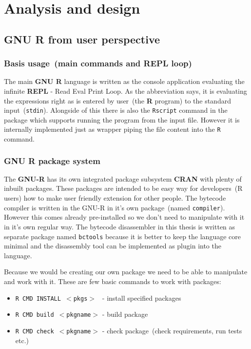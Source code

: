 \documentclass[thesis=M,english]{FITthesis}[2018/10/20]
\newcommand{\code}[1]{\texttt{#1}}
\begin{document}
\chapter{Analysis and design}

\section{GNU R from user perspective}\label{R-UI}

\subsection{Basis usage~(main commands and REPL loop)}\label{REPL}

The main \textbf{GNU R} language is written as the console application evaluating the infinite \textbf{REPL} - Read Eval Print Loop. As the abbreviation says, it is evaluating the expressions right as is entered by user~(the \textbf{R} program) to the standard input~(\code{stdin}). Alongside of this there is also the \code{Rscript} command in the package which supports running the program from the input file. However it is internally implemented just as wrapper piping the file content into the \code{R} command. 

\subsection{GNU R package system}\label{R-Packages}

The \textbf{GNU-R} has its own integrated package subsystem \textbf{CRAN} with plenty of inbuilt packages. These packages are intended to be easy way for developers~(R users) how to make user friendly extension for other people. The bytecode compiler is written in the GNU-R in it's own package~(named \code{compiler}). However this comes already pre-installed so we don't need to manipulate with it in it's own regular way. The bytecode disassembler in this thesis is written as separate package named \code{bctools} because it is better to keep the language core minimal and the disassembly tool can be implemented as plugin into the language.

Because we would be creating our own package we need to be able to manipulate and work with it. These are few basic commands to work with packages:

\begin{itemize}
	\item \code{R CMD INSTALL $<$pkgs$>$ } - install specified packages
	\item \code{R CMD build $<$pkgname$>$} - build package
	\item \code{R CMD check $<$pkgname$>$} - check package~(check requirements, run tests etc.)
\end{itemize}
\end{document}
